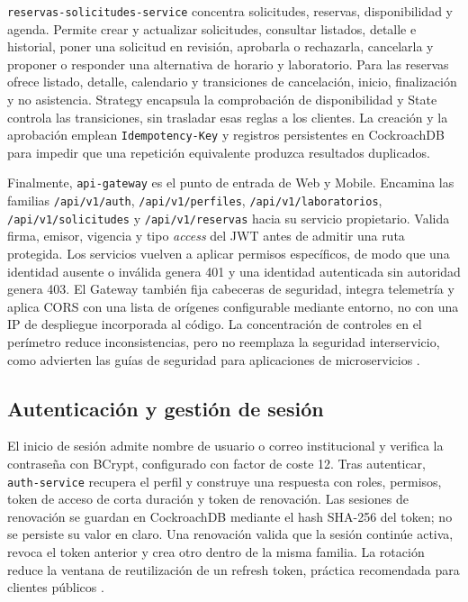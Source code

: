 \texttt{reservas-solicitudes-service} concentra solicitudes, reservas,
disponibilidad y agenda. Permite crear y actualizar solicitudes, consultar
listados, detalle e historial, poner una solicitud en revisión, aprobarla o
rechazarla, cancelarla y proponer o responder una alternativa de horario y
laboratorio. Para las reservas ofrece listado, detalle, calendario y
transiciones de cancelación, inicio, finalización y no asistencia. Strategy
encapsula la comprobación de disponibilidad y State controla las transiciones,
sin trasladar esas reglas a los clientes. La creación y la aprobación emplean
\texttt{Idempotency-Key} y registros persistentes en CockroachDB para impedir
que una repetición equivalente produzca resultados duplicados.

Finalmente, \texttt{api-gateway} es el punto de entrada de Web y Mobile.
Encamina las familias \texttt{/api/v1/auth}, \texttt{/api/v1/perfiles},
\texttt{/api/v1/laboratorios}, \texttt{/api/v1/solicitudes} y
\texttt{/api/v1/reservas} hacia su servicio propietario. Valida firma, emisor,
vigencia y tipo \emph{access} del JWT antes de admitir una ruta protegida. Los
servicios vuelven a aplicar permisos específicos, de modo que una identidad
ausente o inválida genera 401 y una identidad autenticada sin autoridad genera
403. El Gateway también fija cabeceras de seguridad, integra telemetría y aplica
CORS con una lista de orígenes configurable mediante entorno, no con una IP de
despliegue incorporada al código. La concentración de controles en el perímetro
reduce inconsistencias, pero no reemplaza la seguridad interservicio, como
advierten las guías de seguridad para aplicaciones de microservicios
\cite{chandramouli2020nist}.

\subsection{Autenticación y gestión de sesión}
\label{subsec:autenticacion-funcional}

El inicio de sesión admite nombre de usuario o correo institucional y verifica
la contraseña con BCrypt, configurado con factor de coste 12. Tras autenticar,
\texttt{auth-service} recupera el perfil y construye una respuesta con roles,
permisos, token de acceso de corta duración y token de renovación. Las sesiones
de renovación se guardan en CockroachDB mediante el hash SHA-256 del token; no se
persiste su valor en claro. Una renovación valida que la sesión continúe activa,
revoca el token anterior y crea otro dentro de la misma familia. La rotación
reduce la ventana de reutilización de un refresh token, práctica recomendada para
clientes públicos \cite{lodderstedt2025rfc9700}.

